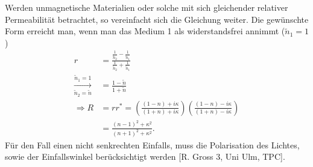 Werden unmagnetische Materialien oder solche mit sich gleichender relativer Permeabilität betrachtet, 
so vereinfacht sich die Gleichung weiter. Die gewünschte Form erreicht man, wenn man das Medium 1 als widerstandsfrei annimmt 
($\tilde{n}_{1} = 1$)
\begin{align}
    r &= \frac{\frac{1}{\tilde{n}_{2}} - \frac{1}{\tilde{n}_{1}}}{\frac{1}{\tilde{n}_{2}} + \frac{1}{\tilde{n}_{1}}} \\
    \xrightarrow[\tilde{n}_{2}=\tilde{n}]{\tilde{n}_{1}=1} &= \frac{1 - \tilde{n}}{1 + \tilde{n}} \\
    \Rightarrow R &= rr^{*} = \left(\frac{(1 - n) + i\kappa}{(1 + n) + i\kappa}\right)\left(\frac{(1 - n) - i\kappa}{(1 + n) - i\kappa}\right) \\
    &= \frac{(n-1)^{2} + \kappa^{2}}{(n+1)^{2} + \kappa^{2}}.
\end{align}
Für den Fall einen nicht senkrechten Einfalls, muss die Polarisation des Lichtes, sowie der Einfallswinkel
berücksichtigt werden [R. Gross 3, Uni Ulm, TPC]. \\ 
